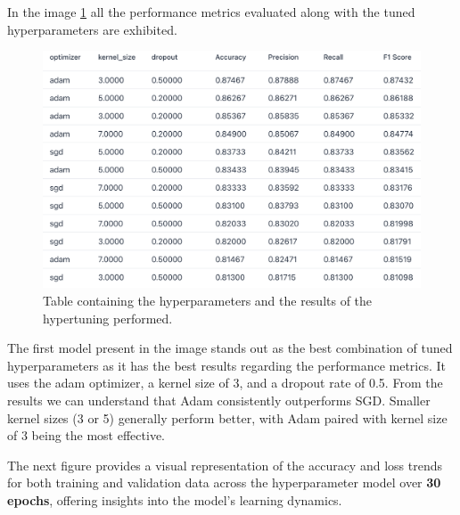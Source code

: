 In the image \ref{fig:CNN_table} all the performance metrics evaluated along with the tuned hyperparameters are exhibited.
\begin{figure}[H]
    \centering
    \includegraphics[width=1\linewidth]{images/CNN_tensorboard_table.png}
    \caption{Table containing the hyperparameters and the results of the hypertuning performed.}
    \label{fig:CNN_table}
\end{figure}
The first model present in the image stands out as the best combination of tuned hyperparameters as it has the best results regarding the performance metrics. It uses the adam optimizer, a kernel size of 3, and a dropout rate of 0.5. From the results we can understand that Adam consistently outperforms SGD. Smaller kernel sizes (3 or 5) generally perform better, with Adam paired with kernel size of 3 being the most effective.

The next figure provides a visual representation of the accuracy and loss trends for both training and validation data across the hyperparameter model over \textbf{30 epochs}, offering insights into the model's learning dynamics.

